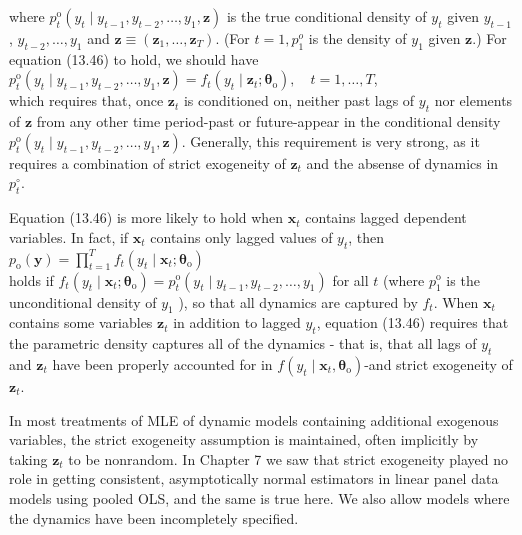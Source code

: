 \documentclass[10pt]{article}
\begin{document}
where $p_{t}^{\mathrm{o}}\left(y_{t} \mid y_{t-1}, y_{t-2}, \ldots, y_{1}, \mathbf{z}\right)$ is the true conditional density of $y_{t}$ given $y_{t-1}$, $y_{t-2}, \ldots, y_{1}$ and $\mathbf{z} \equiv\left(\mathbf{z}_{1}, \ldots, \mathbf{z}_{T}\right)$. (For $t=1, p_{1}^{o}$ is the density of $y_{1}$ given $\mathbf{z}$.) For equation (13.46) to hold, we should have\\
$p_{t}^{\mathrm{o}}\left(y_{t} \mid y_{t-1}, y_{t-2}, \ldots, y_{1}, \mathbf{z}\right)=f_{t}\left(y_{t} \mid \mathbf{z}_{t} ; \boldsymbol{\theta}_{\mathrm{o}}\right), \quad t=1, \ldots, T$,\\
which requires that, once $\mathbf{z}_{t}$ is conditioned on, neither past lags of $y_{t}$ nor elements of $\mathbf{z}$ from any other time period-past or future-appear in the conditional density $p_{t}^{\mathrm{o}}\left(y_{t} \mid y_{t-1}, y_{t-2}, \ldots, y_{1}, \mathbf{z}\right)$. Generally, this requirement is very strong, as it requires a combination of strict exogeneity of $\mathbf{z}_{t}$ and the absense of dynamics in $p_{t}^{\circ}$.

Equation (13.46) is more likely to hold when $\mathbf{x}_{t}$ contains lagged dependent variables. In fact, if $\mathbf{x}_{t}$ contains only lagged values of $y_{t}$, then\\
$p_{\mathrm{o}}(\mathbf{y})=\prod_{t=1}^{T} f_{t}\left(y_{t} \mid \mathbf{x}_{t} ; \boldsymbol{\theta}_{\mathrm{o}}\right)$\\
holds if $f_{t}\left(y_{t} \mid \mathbf{x}_{t} ; \boldsymbol{\theta}_{\mathrm{o}}\right)=p_{t}^{\mathrm{o}}\left(y_{t} \mid y_{t-1}, y_{t-2}, \ldots, y_{1}\right)$ for all $t$ (where $p_{1}^{\mathrm{o}}$ is the unconditional density of $y_{1}$ ), so that all dynamics are captured by $f_{t}$. When $\mathbf{x}_{t}$ contains some variables $\mathbf{z}_{t}$ in addition to lagged $y_{t}$, equation (13.46) requires that the parametric density captures all of the dynamics - that is, that all lags of $y_{t}$ and $\mathbf{z}_{t}$ have been properly accounted for in $f\left(y_{t} \mid \mathbf{x}_{t}, \boldsymbol{\theta}_{\mathrm{o}}\right)$-and strict exogeneity of $\mathbf{z}_{t}$.

In most treatments of MLE of dynamic models containing additional exogenous variables, the strict exogeneity assumption is maintained, often implicitly by taking $\mathbf{z}_{t}$ to be nonrandom. In Chapter 7 we saw that strict exogeneity played no role in getting consistent, asymptotically normal estimators in linear panel data models using pooled OLS, and the same is true here. We also allow models where the dynamics have been incompletely specified.
\end{document}
